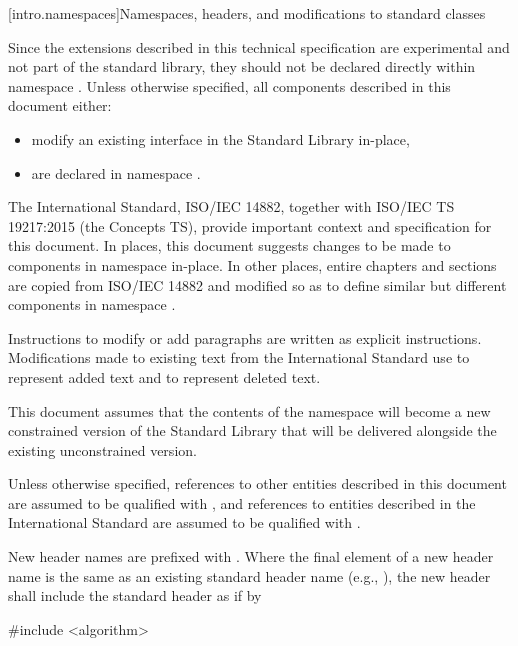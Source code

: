 [intro.namespaces]{Namespaces, headers, and modifications to standard classes}

\pnum
Since the extensions described in this technical specification are experimental and not
part of the \Cpp standard library, they should not be declared directly within namespace
. Unless otherwise specified, all components described in this document either:

\begin{itemize}
\item modify an existing interface in the \Cpp Standard Library in-place,
\item are declared in namespace .
\end{itemize}

\pnum
The International Standard, ISO/IEC 14882, together with ISO/IEC TS 19217:2015 (the Concepts TS),
provide important context and specification for this document. In places, this document suggests
changes to be made to components in namespace  in-place. In
other places, entire chapters and sections are copied from ISO/IEC 14882 and modified so as to
define similar but different components in namespace .

\pnum
Instructions to modify or add paragraphs are written as explicit instructions.
Modifications made to existing text from the International Standard use
 to represent added text and  to
represent deleted text.

\pnum
This document assumes that the contents of the 
namespace will become a new constrained version of the \Cpp Standard Library
that will be delivered alongside the existing unconstrained version.

\pnum
Unless otherwise specified, references to other entities described in this
document are assumed to be qualified with , and
references to entities described in the International Standard are assumed to be
qualified with .

\pnum
New header names are prefixed with . Where
the final element of a new header name is the same as an existing standard header
name (e.g., ), the new header shall include
the standard header as if by

\begin{codeblock}
#include <algorithm>
\end{codeblock}
